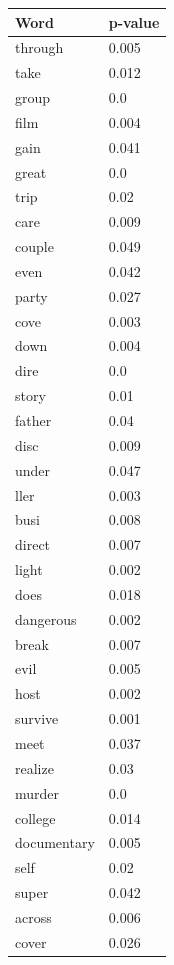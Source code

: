 \documentclass[12pt, oneside]{article}   	%
\begin{document}
\begin{table}
\begin{tabular}[t]{l|l}
\end{tabular}
\begin{tabular}[t]{l|l}
\textbf{Word}        & \textbf{p-value} \\ \hline
through     & 0.005    \\
take        & 0.012    \\
group       & 0.0      \\
film        & 0.004    \\
gain        & 0.041    \\
great       & 0.0      \\
trip        & 0.02     \\
care        & 0.009    \\
couple      & 0.049    \\
even        & 0.042    \\
party       & 0.027    \\
cove        & 0.003    \\
down        & 0.004    \\
dire        & 0.0      \\
story       & 0.01     \\
father      & 0.04     \\
disc        & 0.009    \\
under       & 0.047    \\
ller        & 0.003    \\
busi        & 0.008    \\
direct      & 0.007    \\
light       & 0.002    \\
does        & 0.018    \\
dangerous   & 0.002    \\
break       & 0.007    \\
evil        & 0.005    \\
host        & 0.002    \\
survive     & 0.001    \\
meet        & 0.037    \\
realize     & 0.03     \\
murder      & 0.0      \\
college     & 0.014    \\
documentary & 0.005    \\
self        & 0.02     \\
super       & 0.042    \\
across      & 0.006    \\
cover       & 0.026    \\

\end{tabular}
\end{table}
\end{document}
